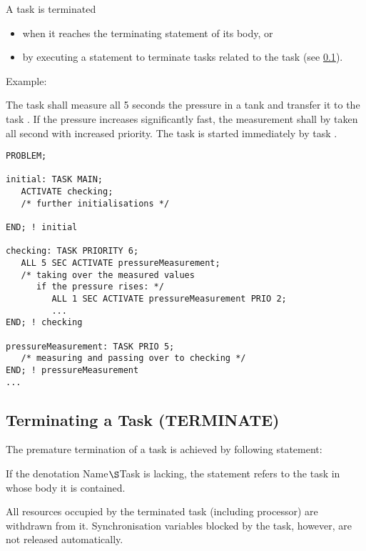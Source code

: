 A task is terminated
\begin{itemize}
\item when it reaches the terminating  statement of its body, or
\item by executing a statement to terminate tasks related to the task
(see \ref{sec_terminate}).
\end{itemize}

Example:

The task  shall measure all 5 seconds
 the pressure in a tank and transfer it to the task .
 If the pressure increases significantly fast, the measurement
 shall by taken all second with increased priority. 
The task  is started immediately by task .

\begin{lstlisting}
PROBLEM;

initial: TASK MAIN;
   ACTIVATE checking;
   /* further initialisations */
 
END; ! initial
       
checking: TASK PRIORITY 6;
   ALL 5 SEC ACTIVATE pressureMeasurement;
   /* taking over the measured values
      if the pressure rises: */
         ALL 1 SEC ACTIVATE pressureMeasurement PRIO 2;
         ...
END; ! checking
 
pressureMeasurement: TASK PRIO 5;
   /* measuring and passing over to checking */
END; ! pressureMeasurement
...
\end{lstlisting}



\subsection{Terminating a Task (TERMINATE)}    %
\label{sec_terminate}

The premature termination of a task is achieved by following
statement:

\begin{grammarframe}
\end{grammarframe}

If the denotation Name$\S $Task is lacking, the statement refers to
the task in whose body it is contained.

All resources occupied by the terminated task (including processor) are
withdrawn from it. Synchronisation variables blocked by the task,
however, are not released automatically.

